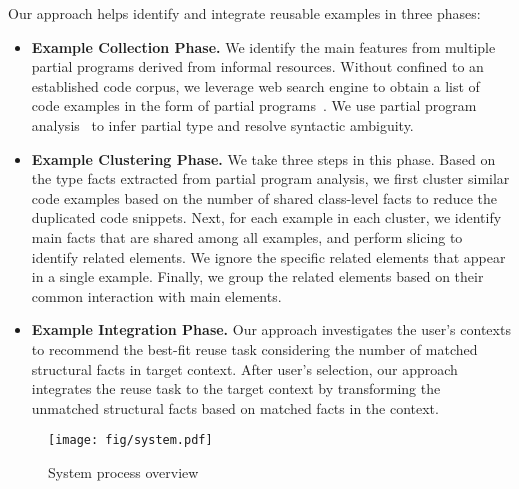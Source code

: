 Our approach helps identify and integrate reusable examples in three phases:
\begin{itemize}
\item \textbf{Example Collection Phase.} We identify the main features from multiple partial programs derived from informal resources. Without confined to an established code corpus, we leverage web search engine to obtain a list of code examples in the form of partial programs~\cite{PeterACE:ICSE13, RecoDoc:ICSE12}. We use partial program analysis~\cite{partialProgram:OOPSLA08} to infer partial type and resolve syntactic ambiguity. 

\item \textbf{Example Clustering Phase.} We take three steps in this phase. Based on the type facts extracted from partial program analysis, we first cluster similar code examples based on the number of shared class-level facts to reduce the duplicated code snippets. Next, for each example in each cluster, we identify main facts that are shared among all examples, and perform slicing to identify related elements. We ignore the specific related elements that appear in a single example. Finally, we group the related elements based on their common interaction with main elements.

\item \textbf{Example Integration Phase.} Our approach investigates the user's contexts to recommend the best-fit reuse task  considering the number of matched structural facts in target context. After user's selection, our approach integrates the reuse task to the target context by transforming the unmatched structural facts based on matched facts in the context. 
\end{itemize}

 \begin{figure*}[!htb]
    \centering
\texttt{[image: fig/system.pdf]}
       \caption{System process overview}
        \label{fig:system}
   \end{figure*}


